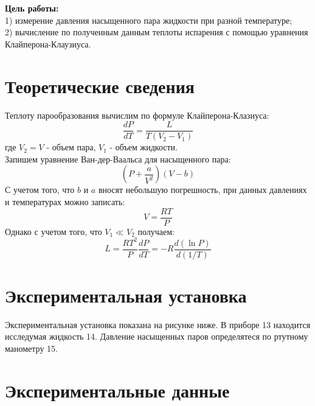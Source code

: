 \textbf{Цель работы:}\\
1) измерение давления насыщенного пара жидкости при разной температуре;\\
2) вычисление по полученным данным теплоты испарения с помощью уравнения 
Клайперона-Клаузиуса. \\\indent 

\section*{Теоретические сведения}
Теплоту парообразования вычислим по формуле Клайперона-Клазиуса:
\begin{equation}
    \frac{dP}{dT} = \frac{L}{T(V_2 - V_1)}
\end{equation}
где $V_2 = V$ - объем пара, $V_1$ - объем жидкости.\\\indent
Запишем уравнение Ван-дер-Ваальса для насыщенного пара:
\begin{equation}
    \left ( P + \frac{a}{V^2}\right )(V - b)
\end{equation}
С учетом того, что $b$ и $a$ вносят небольшую погрешность, 
при данных давлениях и температурах можно записать:
\begin{equation}
    V = \frac{RT}{P}
\end{equation}
Однако с учетом того, что $V_1 \ll V_2$ получаем:
\begin{equation}
    L = \frac{RT^2}{P}\frac{dP}{dT} = -R\frac{d(\ln P)}{d(1/T)}
\end{equation}

\section*{Экспериментальная установка}
Экспериментальная установка показана на рисунке ниже. В приборе 13 находится 
исследумая жидкость 14. Давление насыщенных паров определятеся по 
ртутному манометру 15. 

\section*{Экспериментальные данные}

\begin{table}
    \centering
    \begin{tabular}
        
    \end{tabular}
    \caption{Зависимость $T$ от $P$}


\end{table}


